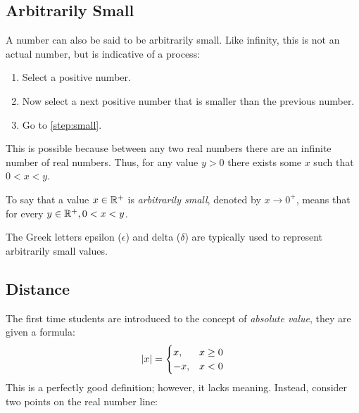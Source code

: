 \documentclass[letterpaper,12pt,fleqn]{article}
\renewcommand{\d}{\delta}
\newcommand{\e}{\epsilon}
\begin{document}
\subsection*{Arbitrarily Small}

A number can also be said to be arbitrarily small.  Like infinity, this is not an actual number, but is indicative
of a process:

\begin{enumerate}
\item Select a positive number.
\item\label{step:small} Now select a next positive number that is smaller than the previous number.
\item Go to \ref{step:small}.
\end{enumerate}

This is possible because between any two real numbers there are an infinite number of real numbers.  Thus, for any
value \(y>0\) there exists some \(x\) such that \(0<x<y\).

\bigskip

\begin{center}
\end{center}

\begin{definition}
  To say that a value \(x\in\mathbb{R}^+\) is \emph{arbitrarily small}, denoted by \(x\to0^+\), means that for every
  \(y\in\mathbb{R}^+,0<x<y\).
\end{definition}

The Greek letters epsilon (\(\e\)) and delta (\(\d\)) are typically used to represent arbitrarily small values.

\subsection*{Distance}

The first time students are introduced to the concept of \emph{absolute value}, they are given a formula:
\[\lvert x\rvert=\begin{cases}
x, & x\ge0 \\
-x, & x<0
\end{cases}\]
This is a perfectly good definition; however, it lacks meaning.  Instead, consider two points on the real
number line:
\end{document}
